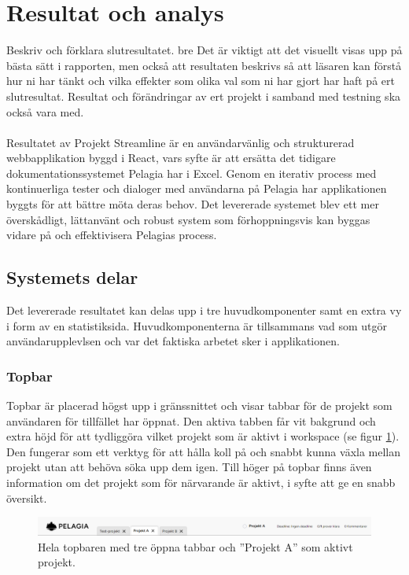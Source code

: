 \section{Resultat och analys}
Beskriv och förklara slutresultatet. bre Det är viktigt att det visuellt visas upp på bästa sätt i rapporten,
men också att resultaten beskrivs så att läsaren kan förstå hur ni har tänkt och vilka effekter som olika val som ni har gjort har haft på ert slutresultat.
Resultat och förändringar av ert projekt i samband med testning ska också vara med.
\\\\
Resultatet av Projekt Streamline är en användarvänlig och strukturerad webbapplikation byggd i React, vars syfte är att ersätta det tidigare dokumentationssystemet Pelagia har i Excel.
Genom en iterativ process med kontinuerliga tester och dialoger med användarna på Pelagia har applikationen byggts för att bättre möta deras behov. Det levererade systemet blev
ett mer överskådligt, lättanvänt och robust system som förhoppningsvis kan byggas vidare på och effektivisera Pelagias process.
\subsection{Systemets delar}
Det levererade resultatet kan delas upp i tre huvudkomponenter samt en extra vy i form av en statistiksida. Huvudkomponenterna är tillsammans vad som utgör användarupplevlsen
och var det faktiska arbetet sker i applikationen.
\subsubsection{Topbar}
Topbar är placerad högst upp i gränssnittet och visar tabbar för de projekt som användaren för tillfället har öppnat. Den aktiva tabben får vit bakgrund
och extra höjd för att tydliggöra vilket projekt som är aktivt i workspace (se figur \ref{fig:topbar}).
Den fungerar som ett verktyg för att hålla koll på och snabbt kunna växla mellan projekt utan att behöva söka upp dem igen.
Till höger på topbar finns även information om det projekt som för närvarande är aktivt, i syfte att ge en snabb översikt.

\begin{figure}[H]
    \centering
    \includegraphics[width=1\linewidth]{images/topbar.PNG}
    \caption{Hela topbaren med tre öppna tabbar och ''Projekt A'' som aktivt projekt.}
    \label{fig:topbar}
\end{figure}

